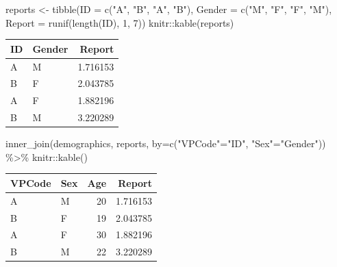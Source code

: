 \documentclass[
]{book}
\newenvironment{Shaded}{\begin{snugshade}}{\end{snugshade}}
\newcommand{\AttributeTok}[1]{\textcolor[rgb]{0.77,0.63,0.00}{#1}}
\newcommand{\DecValTok}[1]{\textcolor[rgb]{0.00,0.00,0.81}{#1}}
\newcommand{\FunctionTok}[1]{\textcolor[rgb]{0.00,0.00,0.00}{#1}}
\newcommand{\NormalTok}[1]{#1}
\newcommand{\OtherTok}[1]{\textcolor[rgb]{0.56,0.35,0.01}{#1}}
\newcommand{\SpecialCharTok}[1]{\textcolor[rgb]{0.00,0.00,0.00}{#1}}
\newcommand{\StringTok}[1]{\textcolor[rgb]{0.31,0.60,0.02}{#1}}
\begin{document}
\begin{Shaded}
\begin{Highlighting}[]
\NormalTok{reports }\OtherTok{\textless{}{-}} \FunctionTok{tibble}\NormalTok{(}\AttributeTok{ID =} \FunctionTok{c}\NormalTok{(}\StringTok{"A"}\NormalTok{, }\StringTok{"B"}\NormalTok{, }\StringTok{"A"}\NormalTok{, }\StringTok{"B"}\NormalTok{),}
                  \AttributeTok{Gender =} \FunctionTok{c}\NormalTok{(}\StringTok{"M"}\NormalTok{, }\StringTok{"F"}\NormalTok{, }\StringTok{"F"}\NormalTok{, }\StringTok{"M"}\NormalTok{),}
                  \AttributeTok{Report =} \FunctionTok{runif}\NormalTok{(}\FunctionTok{length}\NormalTok{(ID), }\DecValTok{1}\NormalTok{, }\DecValTok{7}\NormalTok{))}
\NormalTok{knitr}\SpecialCharTok{::}\FunctionTok{kable}\NormalTok{(reports)}
\end{Highlighting}
\end{Shaded}

\begin{tabular}{l|l|r}
\hline
ID & Gender & Report\\
\hline
A & M & 1.716153\\
\hline
B & F & 2.043785\\
\hline
A & F & 1.882196\\
\hline
B & M & 3.220289\\
\hline
\end{tabular}

\begin{Shaded}
\begin{Highlighting}[]
\FunctionTok{inner\_join}\NormalTok{(demographics, reports, }\AttributeTok{by=}\FunctionTok{c}\NormalTok{(}\StringTok{"VPCode"}\OtherTok{=}\StringTok{"ID"}\NormalTok{, }\StringTok{"Sex"}\OtherTok{=}\StringTok{"Gender"}\NormalTok{)) }\SpecialCharTok{\%\textgreater{}\%}
\NormalTok{  knitr}\SpecialCharTok{::}\FunctionTok{kable}\NormalTok{()}
\end{Highlighting}
\end{Shaded}

\begin{tabular}{l|l|r|r}
\hline
VPCode & Sex & Age & Report\\
\hline
A & M & 20 & 1.716153\\
\hline
B & F & 19 & 2.043785\\
\hline
A & F & 30 & 1.882196\\
\hline
B & M & 22 & 3.220289\\
\hline
\end{tabular}
\end{document}
